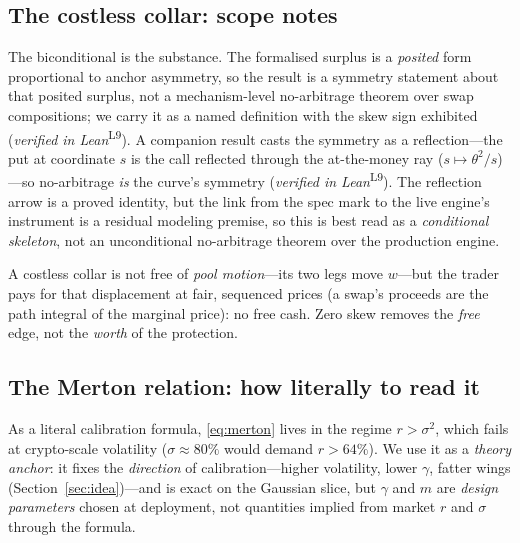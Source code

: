 \documentclass[runningheads]{llncs}
\newcommand{\tfp}{\emph{verified in Lean}}
\begin{document}
\subsection{The costless collar: scope notes}
The biconditional is the substance. The formalised surplus is a \emph{posited}
form proportional to anchor asymmetry, so the result is a symmetry statement about
that posited surplus, not a mechanism-level no-arbitrage theorem over swap
compositions; we carry it as a named definition with the skew sign exhibited
(\tfp{}\textsuperscript{L9}). A companion result casts the symmetry as a
reflection---the put at coordinate $s$ is the call reflected through the
at-the-money ray ($s\mapsto\theta^{2}/s$)---so no-arbitrage \emph{is} the curve's
symmetry (\tfp{}\textsuperscript{L9}). The reflection arrow is a proved identity,
but the link from the spec mark to the live engine's instrument is a residual
modeling premise, so this is best read as a \emph{conditional skeleton}, not an
unconditional no-arbitrage theorem over the production engine.

A costless collar is not free of \emph{pool motion}---its two legs move $w$---but
the trader pays for that displacement at fair, sequenced prices (a swap's proceeds
are the path integral of the marginal price): no free cash. Zero skew removes the
\emph{free} edge, not the \emph{worth} of the protection.

\subsection{The Merton relation: how literally to read it}
As a literal calibration formula, \eqref{eq:merton} lives in the regime
$r>\sigma^{2}$, which fails at crypto-scale volatility ($\sigma\approx80\%$ would
demand $r>64\%$). We use it as a \emph{theory anchor}: it fixes the
\emph{direction} of calibration---higher volatility, lower $\gamma$, fatter wings
(Section~\ref{sec:idea})---and is exact on the Gaussian slice, but $\gamma$ and
$m$ are \emph{design parameters} chosen at deployment, not quantities implied
from market $r$ and $\sigma$ through the formula.

\end{document}
